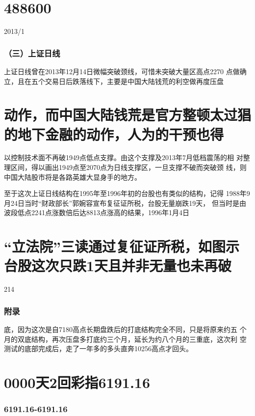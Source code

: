 \documentclass{article}
\begin{document}
\section{488600}

2013/1

\subsubsection{（三）上证日线}

上证日线曾在2013年12月14日微幅突破颈线，可惜未突破大量区高点2270 点做确立，且在五个交易日后跌落线下，主要是中国大陆钱荒的利空做再度压盘

\section{动作，而中国大陆钱荒是官方整顿太过猖的地下金融的动作，人为的干预也得}

以控制技术面不再破1949点低点支撑。由这个支撑及2013年7月低档震荡的相 对整理区间，得以画出1949点至2070点为日线支撑区，一旦支撑不破而突破颈 线，则中国大陆股市将是各路英雄大显身手的地方。

至于这次上证日线结构在1995年至1996年初的台股也有类似的结构，记得 1988年9月24日当时“财政部长”郭婉容宣布复征证所税，台股无量崩跌19天， 但当时是由波段低点2241点涨数倍后达8813点涨高的结果，1996年1月4日

\section{“立法院”三读通过复征证所税，如图示台股这次只跌1天且并非无量也未再破}

214

\clearpage

\subsubsection{附录}

底，因为这次是自7180高点长期盘跌后的打底结构完全不同，只是将原来约五 个月的双底结构，再次压盘多打底约三个月，延长为约八个月的三重底，这次利 空测试的底部完成后，走了一年多的多头直奔10256高点才回头。

\section{0000天2回彩指6191.16}

\subsubsection{6191.16-6191.16}
\end{document}
